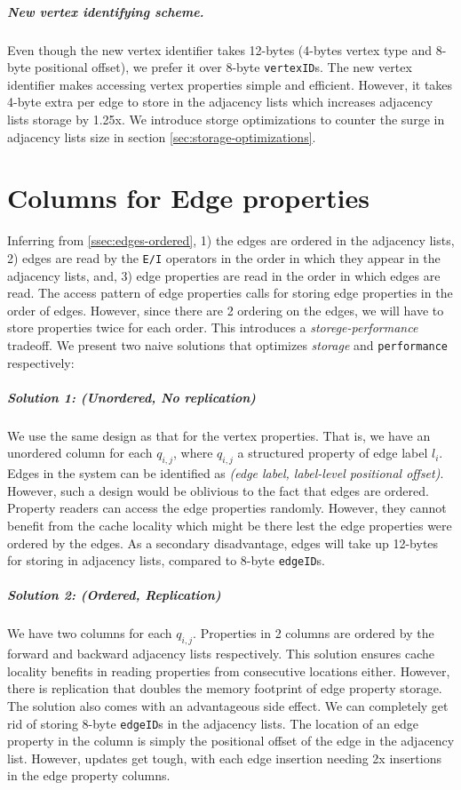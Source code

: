 \vspace{-12pt}
\subparagraph{New vertex identifying scheme.}Even though the new vertex identifier takes 12-bytes (4-bytes vertex type and 8-byte positional offset), we prefer it over 8-byte \texttt{vertexID}s. The new vertex identifier makes accessing vertex properties simple and efficient. However, it takes 4-byte extra per edge to store in the adjacency lists which increases adjacency lists storage by 1.25x. We introduce storge optimizations to counter the surge in adjacency lists size in section \ref{sec:storage-optimizations}.

\section{Columns for Edge properties}
\label{sec:edge-property-columns}

Inferring from \ref{ssec:edges-ordered}, 1) the edges are ordered in the adjacency lists, 2) edges are read by the \texttt{E/I} operators in the order in which they appear in the adjacency lists, and, 3) edge properties are read in the order in which edges are read. The access pattern of edge properties calls for storing edge properties in the order of edges. However, since there are 2 ordering on the edges, we will have to store properties twice for each order. This introduces a \emph{storege-performance} tradeoff. We present two naive solutions that optimizes \emph{storage} and \texttt{performance} respectively:

\vspace{-12pt}
\subparagraph{Solution 1: (Unordered, No replication) } We use the same design as that for the vertex properties. That is, we have an unordered column for each $q_{i,j}$, where $q_{i,j}$ a structured property of edge label $l_i$. Edges in the system can be identified as \emph{(edge label, label-level positional offset)}. However, such a design would be oblivious to the fact that edges are ordered. Property readers can access the edge properties randomly. However, they cannot benefit from the cache locality which might be there lest the edge properties were ordered by the edges. As a secondary disadvantage, edges will take up 12-bytes for storing in adjacency lists, compared to 8-byte \texttt{edgeID}s.

\vspace{-12pt}
\subparagraph{Solution 2: (Ordered, Replication) } We have two columns for each $q_{i,j}$. Properties in 2 columns are ordered by the forward and backward adjacency lists respectively. This solution ensures cache locality benefits in reading properties from consecutive locations either. However, there is replication that doubles the memory footprint of edge property storage. The solution also comes with an advantageous side effect. We can completely get rid of storing 8-byte \texttt{edgeID}s in the adjacency lists. The location of an edge property in the column is simply the positional offset of the edge in the adjacency list. However, updates get tough, with each edge insertion needing 2x insertions in the edge property columns.

